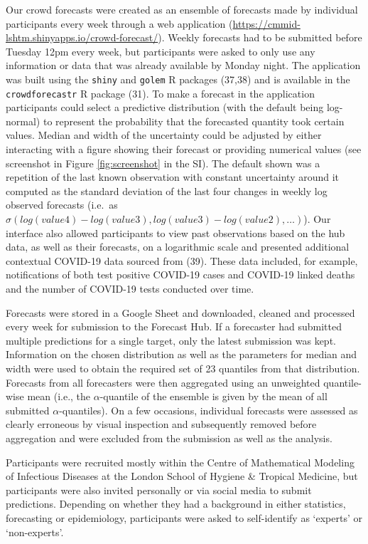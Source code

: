 \documentclass[
]{article}
\begin{document}
Our crowd forecasts were created as an ensemble of forecasts made by individual participants every week through a web application (\url{https://cmmid-lshtm.shinyapps.io/crowd-forecast/}). Weekly forecasts had to be submitted before Tuesday 12pm every week, but participants were asked to only use any information or data that was already available by Monday night. The application was built using the \texttt{shiny} and \texttt{golem} R packages (37,38) and is available in the \texttt{crowdforecastr} R package (31). To make a forecast in the application participants could select a predictive distribution (with the default being log-normal) to represent the probability that the forecasted quantity took certain values. Median and width of the uncertainty could be adjusted by either interacting with a figure showing their forecast or providing numerical values (see screenshot in Figure \ref{fig:screenshot} in the SI). The default shown was a repetition of the last known observation with constant uncertainty around it computed as the standard deviation of the last four changes in weekly log observed forecasts (i.e.~as \(\sigma(log(value4) - log(value3), log(value3) - log(value2), \ldots )\)).
Our interface also allowed participants to view past observations based on the hub data, as well as their forecasts, on a logarithmic scale and presented additional contextual COVID-19 data sourced from (39). These data included, for example, notifications of both test positive COVID-19 cases and COVID-19 linked deaths and the number of COVID-19 tests conducted over time.

Forecasts were stored in a Google Sheet and downloaded, cleaned and processed every week for submission to the Forecast Hub. If a forecaster had submitted multiple predictions for a single target, only the latest submission was kept. Information on the chosen distribution as well as the parameters for median and width were used to obtain the required set of 23 quantiles from that distribution. Forecasts from all forecasters were then aggregated using an unweighted quantile-wise mean (i.e., the \(\alpha\)-quantile of the ensemble is given by the mean of all submitted \(\alpha\)-quantiles). On a few occasions, individual forecasts were assessed as clearly erroneous by visual inspection and subsequently removed before aggregation and were excluded from the submission as well as the analysis.

Participants were recruited mostly within the Centre of Mathematical Modeling of Infectious Diseases at the London School of Hygiene \& Tropical Medicine, but participants were also invited personally or via social media to submit predictions. Depending on whether they had a background in either statistics, forecasting or epidemiology, participants were asked to self-identify as `experts' or `non-experts'.
\end{document}
